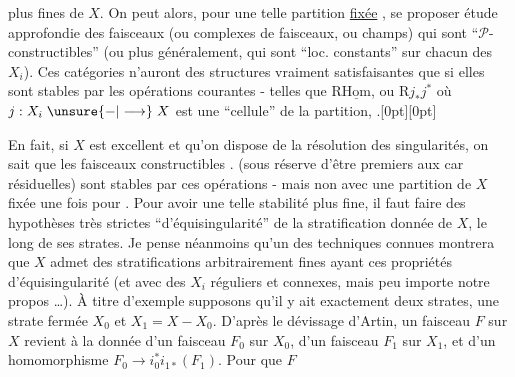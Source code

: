 plus fines de $X$. On peut alors, pour une telle partition \uline{fixée} , se proposer  étude approfondie  des faisceaux (ou complexes de faisceaux, ou champs) qui sont ``$\mathcal P$-constructibles'' (ou plus généralement, qui sont ``loc. constants'' sur chacun des $X_i$). Ces catégories n'auront des structures vraiment  satisfaisantes que si elles sont stables par les opérations courantes - telles que $\mathrm R\underline{\mathrm{Hom}}$, ou $\mathrm Rj_*j^*$ où $j:X_i\mathrel{\unsure{-|\longrightarrow}}X$ est une ``cellule'' de la partition, .\raisebox{0.35ex}[0pt][0pt]{\parbox[c][0pt][c]{0pt}{}} En fait, si $X$ est excellent et qu'on dispose de la résolution des singularités, on sait que les faisceaux  constructibles . (sous réserve d'être premiers aux car résiduelles) sont stables par  ces opérations - mais non avec une partition de $X$ fixée une fois pour . Pour avoir une telle stabilité plus fine, il faut faire des hypothèses très strictes  ``d'équisingularité'' de la stratification donnée de $X$, le long de ses strates. Je pense néanmoins qu'un  des techniques connues montrera que $X$ admet des stratifications arbitrairement fines ayant ces propriétés d'équisingularité (et avec des $X_i$ réguliers et connexes, mais peu importe  notre propos \ldots). À titre d'exemple
%
supposons qu'il y ait exactement deux strates, une strate fermée $X_0$ et $X_1=X-X_0$. D'après le dévissage d'Artin, un faisceau $F$ sur $X$ revient à la donnée d'un faisceau $F_0$  sur $X_0$, d'un faisceau $F_1$  sur $X_1$, et d'un homomorphisme $F_0\longrightarrow i_0^*i_{1*}(F_1)$. Pour que $F$
\reversemarginpar
{}%
